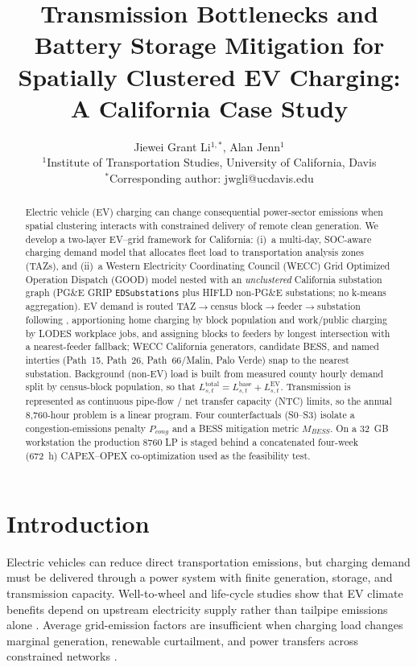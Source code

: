 \documentclass[11pt]{article}
\title{Transmission Bottlenecks and Battery Storage Mitigation for Spatially Clustered EV Charging: A California Case Study}
\author{Jiewei Grant Li$^{1,*}$, Alan Jenn$^{1}$\\
\small $^1$Institute of Transportation Studies, University of California, Davis\\
\small $^*$Corresponding author: jwgli@ucdavis.edu}
\date{}
\begin{document}
\maketitle

\begin{abstract}
Electric vehicle (EV) charging can change consequential power-sector emissions when spatial clustering interacts with constrained delivery of remote clean generation. We develop a two-layer EV--grid framework for California: (i)~a multi-day, SOC-aware charging demand model that allocates fleet load to transportation analysis zones (TAZs), and (ii)~a Western Electricity Coordinating Council (WECC) Grid Optimized Operation Dispatch (GOOD) model nested with an \emph{unclustered} California substation graph (PG\&E GRIP \texttt{EDSubstations} plus HIFLD non-PG\&E substations; no k-means aggregation). EV demand is routed TAZ\(\to\)census block\(\to\)feeder\(\to\)substation following \citet{li_impact_2024}, apportioning home charging by block population and work/public charging by LODES workplace jobs, and assigning blocks to feeders by longest intersection with a nearest-feeder fallback; WECC California generators, candidate BESS, and named interties (Path~15, Path~26, Path~66/Malin, Palo Verde) snap to the nearest substation. Background (non-EV) load is built from measured county hourly demand split by census-block population, so that \(L^{\text{total}}_{s,t}=L^{\text{base}}_{s,t}+L^{\text{EV}}_{s,t}\). Transmission is represented as continuous pipe-flow / net transfer capacity (NTC) limits, so the annual 8{,}760-hour problem is a linear program. Four counterfactuals (S0--S3) isolate a congestion-emissions penalty \(P_{cong}\) and a BESS mitigation metric \(M_{BESS}\). On a 32~GB workstation the production 8760 LP is staged behind a concatenated four-week (672~h) CAPEX--OPEX co-optimization used as the feasibility test.
\end{abstract}

\section{Introduction}

Electric vehicles can reduce direct transportation emissions, but charging demand must be delivered through a power system with finite generation, storage, and transmission capacity. Well-to-wheel and life-cycle studies show that EV climate benefits depend on upstream electricity supply rather than tailpipe emissions alone \citep{hawkins_comparative_2013,tamayao_regional_2015,challa_well--wheel_2022}. Average grid-emission factors are insufficient when charging load changes marginal generation, renewable curtailment, and power transfers across constrained networks \citep{ambrose_trends_2020,burton_data-driven_2023}.
\end{document}
